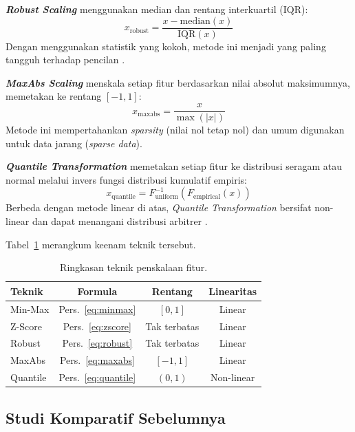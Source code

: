 \documentclass[12pt,a4paper]{article}
\begin{document}
\textbf{\textit{Robust Scaling}} menggunakan median dan rentang interkuartil
(IQR):
\begin{equation}
  x_{\text{robust}} = \frac{x - \text{median}(x)}{\text{IQR}(x)}
  \label{eq:robust}
\end{equation}
Dengan menggunakan statistik yang kokoh, metode ini menjadi yang paling tangguh
terhadap pencilan \cite{templ2023robust}.

\textbf{\textit{MaxAbs Scaling}} menskala setiap fitur berdasarkan nilai absolut
maksimumnya, memetakan ke rentang $[-1, 1]$:
\begin{equation}
  x_{\text{maxabs}} = \frac{x}{\max(|x|)}
  \label{eq:maxabs}
\end{equation}
Metode ini mempertahankan \textit{sparsity} (nilai nol tetap nol) dan umum
digunakan untuk data jarang (\textit{sparse data}).

\textbf{\textit{Quantile Transformation}} memetakan setiap fitur ke distribusi
seragam atau normal melalui invers fungsi distribusi kumulatif empiris:
\begin{equation}
  x_{\text{quantile}} = F^{-1}_{\text{uniform}}(F_{\text{empirical}}(x))
  \label{eq:quantile}
\end{equation}
Berbeda dengan metode linear di atas, \textit{Quantile Transformation} bersifat
non-linear dan dapat menangani distribusi arbitrer
\cite{demircioglu2024normalization}.

Tabel~\ref{tbl:scalers} merangkum keenam teknik tersebut.

\begin{table}[ht]
\centering
\caption{Ringkasan teknik penskalaan fitur.}
\label{tbl:scalers}
\begin{tabular}{lccc}
\toprule
Teknik & Formula & Rentang & Linearitas \\
\midrule
Min-Max         & Pers.~\eqref{eq:minmax}  & $[0, 1]$     & Linear \\
Z-Score         & Pers.~\eqref{eq:zscore}  & Tak terbatas  & Linear \\
Robust          & Pers.~\eqref{eq:robust}  & Tak terbatas  & Linear \\
MaxAbs          & Pers.~\eqref{eq:maxabs}  & $[-1, 1]$    & Linear \\
Quantile        & Pers.~\eqref{eq:quantile}& $(0, 1)$     & Non-linear \\
\bottomrule
\end{tabular}
\end{table}

\subsection{Studi Komparatif Sebelumnya}
\label{sec:prev}
\end{document}
